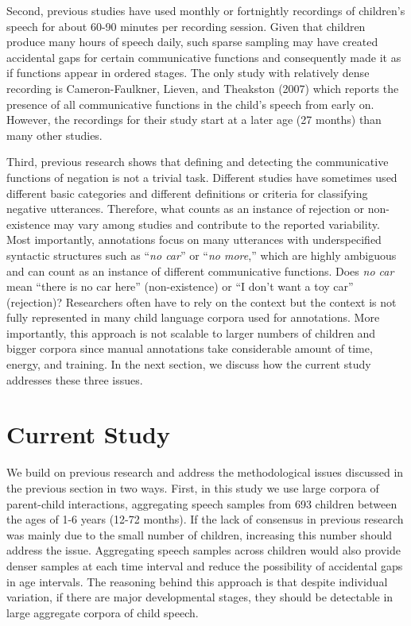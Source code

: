 \documentclass[
  english,
  man,floatsintext]{apa6}
\begin{document}
Second, previous studies have used monthly or fortnightly recordings of children's speech for about 60-90 minutes per recording session. Given that children produce many hours of speech daily, such sparse sampling may have created accidental gaps for certain communicative functions and consequently made it as if functions appear in ordered stages. The only study with relatively dense recording is Cameron-Faulkner, Lieven, and Theakston (2007) which reports the presence of all communicative functions in the child's speech from early on. However, the recordings for their study start at a later age (27 months) than many other studies.

Third, previous research shows that defining and detecting the communicative functions of negation is not a trivial task. Different studies have sometimes used different basic categories and different definitions or criteria for classifying negative utterances. Therefore, what counts as an instance of rejection or non-existence may vary among studies and contribute to the reported variability. Most importantly, annotations focus on many utterances with underspecified syntactic structures such as ``\emph{no car}'' or ``\emph{no more},'' which are highly ambiguous and can count as an instance of different communicative functions. Does \emph{no car} mean ``there is no car here'' (non-existence) or ``I don't want a toy car'' (rejection)? Researchers often have to rely on the context but the context is not fully represented in many child language corpora used for annotations. More importantly, this approach is not scalable to larger numbers of children and bigger corpora since manual annotations take considerable amount of time, energy, and training. In the next section, we discuss how the current study addresses these three issues.

\hypertarget{current-study}{%
\section{Current Study}\label{current-study}}

We build on previous research and address the methodological issues discussed in the previous section in two ways. First, in this study we use large corpora of parent-child interactions, aggregating speech samples from 693 children between the ages of 1-6 years (12-72 months). If the lack of consensus in previous research was mainly due to the small number of children, increasing this number should address the issue. Aggregating speech samples across children would also provide denser samples at each time interval and reduce the possibility of accidental gaps in age intervals. The reasoning behind this approach is that despite individual variation, if there are major developmental stages, they should be detectable in large aggregate corpora of child speech.
\end{document}
